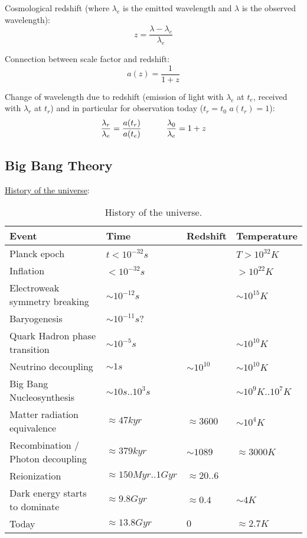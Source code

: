 		\noindent
		Cosmological redshift (where $\lambda_e$ is the emitted wavelength and $\lambda$ is the observed wavelength):
		\begin{equation}
			z = \frac{\lambda - \lambda_e}{\lambda_e}
		\end{equation}

		\noindent
		Connection between scale factor and redshift:
		\begin{equation}
			a(z) = \frac{1}{1+z}
		\end{equation}

		\noindent
		Change of wavelength due to redshift (emission of light with $\lambda_e$ at $t_e$, received with $\lambda_r$ at $t_r$) and in particular for observation today ($t_r=t_0$ \ie $a(t_r)=1$):
		\begin{equation}
			\frac{\lambda_r}{\lambda_e} = \frac{a(t_r)}{a(t_e)}
			\hspace{30pt}
			\frac{\lambda_0}{\lambda_e} = 1+z
		\end{equation}

	\subsection{Big Bang Theory}
		\noindent
		\href{https://en.wikipedia.org/wiki/Chronology_of_the_universe#Tabular_summary}{History of the universe}:
		\begin{table}[ht]
			\begin{center}
				\begin{tabular}{ l | l | l | l }
					Event & Time & Redshift & Temperature \\ \hline
					Planck epoch & $t < 10^{-32}\unit{s}$ & & $T>10^{32}\unit{K}$ \\
					Inflation & $< 10^{-32}\unit{s}$ & & $>10^{22}\unit{K}$ \\
					Electroweak symmetry breaking & $\sim 10^{-12}\unit{s}$ & & $\sim10^{15}\unit{K}$ \\
					Baryogenesis & $\sim 10^{-11}\unit{s}$? & & \\
					Quark Hadron phase transition & $\sim 10^{-5}\unit{s}$ & & $\sim 10^{10}\unit{K}$ \\
					Neutrino decoupling & $\sim 1\unit{s}$ & $\sim 10^{10}$ & $\sim 10^{10}\unit{K}$ \\
					Big Bang Nucleosynthesis & $\sim 10 \unit{s}..10^3\unit{s}$ & & $\sim 10^9\unit{K}..10^7\unit{K}$ \\
					Matter radiation equivalence & $\approx 47\unit{kyr}$ & $\approx 3600$ & $\sim 10^4\unit{K}$ \\
					Recombination / Photon decoupling & $\approx 379\unit{kyr}$ & $\sim 1089$ & $\approx 3000\unit{K}$ \\
					Reionization & $\approx 150\unit{Myr}..1\unit{Gyr}$ & $\approx 20..6$ &  \\
					Dark energy starts to dominate & $\approx 9.8\unit{Gyr}$ & $\approx 0.4$ & $\sim 4\unit{K}$ \\
					Today & $\approx 13.8\unit{Gyr}$ & $0$ & $\approx 2.7\unit{K}$ \\
				\end{tabular}
				\caption{History of the universe.}
			\end{center}
		\end{table}

